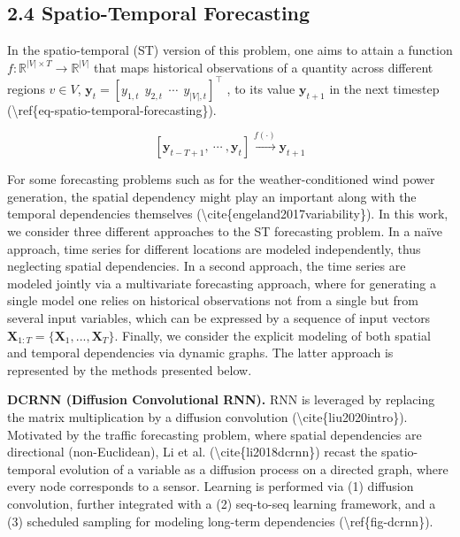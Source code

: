 \documentclass[
]{article}
\begin{document}
\hypertarget{header-n160}{%
\subsection{2.4 Spatio-Temporal Forecasting}\label{header-n160}}

In the spatio-temporal (ST) version of this problem, one aims to attain
a function \(f: \mathbb{R}^{|V|\times T} \rightarrow \mathbb{R}^{|V|}\)
that maps historical observations of a quantity across different regions
\(v\in V\),
\(\boldsymbol{y}_t = [y_{1,t}\  \  y_{2,t}\ \ \cdots \ \ y_{|V|,t}]^\top\)
, to its value \(\boldsymbol{y}_{t+1}\) in the next timestep
(\textbackslash ref\{eq-spatio-temporal-forecasting\}).

\[[\boldsymbol{y}_{t-T+1}, \  \cdots\ , \boldsymbol{y}_{t}] \xrightarrow{f(\cdot)} \boldsymbol{y}_{t+1}\]

For some forecasting problems such as for the weather-conditioned wind
power generation, the spatial dependency might play an important along
with the temporal dependencies themselves
(\textbackslash cite\{engeland2017variability\}). In this work, we
consider three different approaches to the ST forecasting problem. In a
naïve approach, time series for different locations are modeled
independently, thus neglecting spatial dependencies. In a second
approach, the time series are modeled jointly via a multivariate
forecasting approach, where for generating a single model one relies on
historical observations not from a single but from several input
variables, which can be expressed by a sequence of input vectors
\(\boldsymbol{X}_{1:T} = \{\boldsymbol{X}_1, ..., \boldsymbol{X}_T\}\).
Finally, we consider the explicit modeling of both spatial and temporal
dependencies via dynamic graphs. The latter approach is represented by
the methods presented below.

\textbf{DCRNN (Diffusion Convolutional RNN).} RNN is leveraged by
replacing the matrix multiplication by a diffusion convolution
(\textbackslash cite\{liu2020intro\}). Motivated by the traffic
forecasting problem, where spatial dependencies are directional
(non-Euclidean), Li et al. (\textbackslash cite\{li2018dcrnn\}) recast
the spatio-temporal evolution of a variable as a diffusion process on a
directed graph, where every node corresponds to a sensor. Learning is
performed via (1) diffusion convolution, further integrated with a (2)
seq-to-seq learning framework, and a (3) scheduled sampling for modeling
long-term dependencies (\textbackslash ref\{fig-dcrnn\}).
\end{document}
